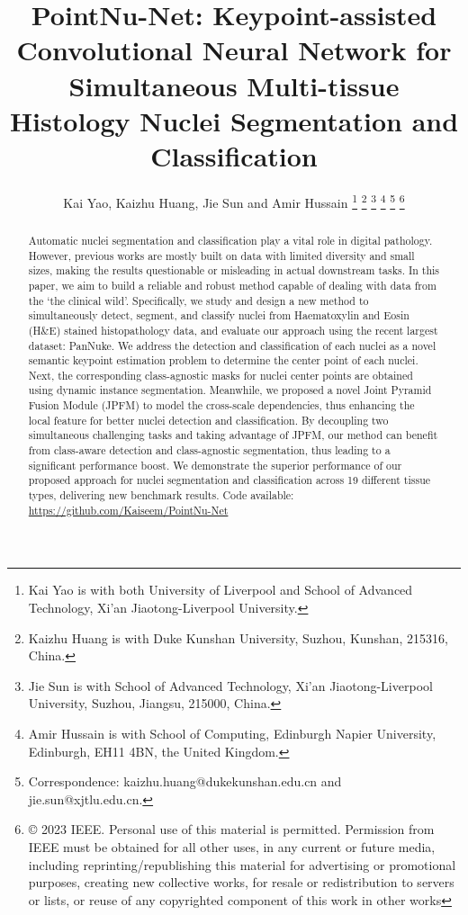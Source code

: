 \documentclass[lettersize,journal]{IEEEtran}
\begin{document}
\title{PointNu-Net: Keypoint-assisted Convolutional Neural Network for Simultaneous Multi-tissue Histology Nuclei Segmentation and Classification}
\author{Kai Yao, Kaizhu Huang, Jie Sun  and  Amir Hussain
\thanks{Kai Yao is with both University of Liverpool and School of Advanced Technology, Xi'an Jiaotong-Liverpool University.}
\thanks{Kaizhu Huang is with Duke Kunshan University, Suzhou, Kunshan, 215316, China.}
\thanks{Jie Sun is with  School of Advanced Technology, Xi'an Jiaotong-Liverpool University, Suzhou, Jiangsu, 215000, China.}
\thanks{Amir Hussain is with School of Computing, Edinburgh Napier University, Edinburgh, EH11 4BN, the United Kingdom. } 
\thanks{Correspondence: 
kaizhu.huang@dukekunshan.edu.cn and jie.sun@xjtlu.edu.cn.}
\thanks{© 2023 IEEE.  Personal use of this material is permitted.  Permission from IEEE must be obtained for all other uses, in any current or future media, including reprinting/republishing this material for advertising or promotional purposes, creating new collective works, for resale or redistribution to servers or lists, or reuse of any copyrighted component of this work in other works}
}

\maketitle

\begin{abstract}
Automatic nuclei segmentation and classification play a vital role in digital pathology. However, previous works are mostly built on data with limited diversity and small sizes, making the results questionable or misleading in actual downstream tasks. In this paper, we aim to build a reliable and robust method capable of dealing with data from the ‘the clinical wild’. Specifically, we study and design a new method to simultaneously detect, segment, and classify nuclei from Haematoxylin and Eosin (H\&E) stained histopathology data, and evaluate our approach using the recent largest dataset: PanNuke. We address the detection and classification of each nuclei as a novel semantic keypoint estimation problem to determine the center point of each nuclei. Next, the corresponding class-agnostic masks for nuclei center points are obtained using dynamic instance segmentation. Meanwhile, we proposed a novel Joint Pyramid Fusion Module (JPFM) to model the cross-scale dependencies, thus enhancing the local feature for better nuclei detection and classification. By decoupling two simultaneous challenging tasks and taking advantage of JPFM, our method can benefit from class-aware detection and class-agnostic segmentation, thus leading to a significant performance boost. We demonstrate the superior performance of our proposed approach for nuclei segmentation and classification across 19 different tissue types, delivering new benchmark results. Code available: \href{https://github.com/Kaiseem/PointNu-Net}{https://github.com/Kaiseem/PointNu-Net}
\end{abstract}
\end{document}
